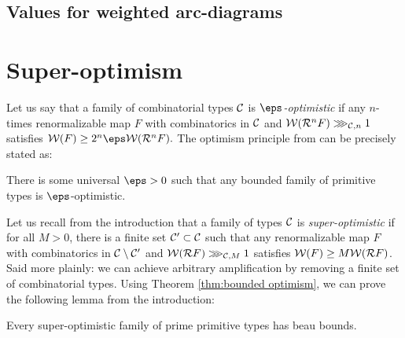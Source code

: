 \documentclass[12pt]{amsart}
\begin{document}
\subsection{Values for weighted arc-diagrams} \label{sec:value}



\section{Super-optimism}\label{sec:life improvement}


Let us say that a family of combinatorial types $\mathcal C$ is \textit{$\eps$-optimistic} if any $n$-times renormalizable \pql map $F$
with combinatorics in $\mathcal C$ and $\mathcal W(\mathcal R^n F)\ggg_{\mathcal C, n} 1$ satisfies $\WW(F)\geq 2^n\eps\WW(\RR^nF).$
The optimism principle from  \cite{K06} can be precisely stated as:
\begin{theorem}[Kahn]\label{thm:bounded optimism}
	There is some universal $\eps>0$ such that any bounded family of primitive types is $\eps$-optimistic. 
\end{theorem}
Let us recall from the introduction that a family of types $\mathcal C$ is \textit{super-optimistic}  if for all $M>0$, there is a finite set $\mathcal C'\subset \mathcal C$ such that any renormalizable \pql map $F$ with combinatorics in $\mathcal C\setminus \mathcal C'$ and $\mathcal W(\mathcal R F)\ggg_{\mathcal C, M} 1$ satisfies $\mathcal W(F)\geq M\mathcal W(\mathcal R F)$. Said more plainly: we can achieve arbitrary amplification by removing a finite set of combinatorial types. 
Using Theorem \ref{thm:bounded optimism}, we can prove the following lemma from the introduction:
\begin{lem}\label{lem:asymptotic optimism}
	Every super-optimistic family of prime primitive types has beau bounds.
\end{lem}
\end{document}
